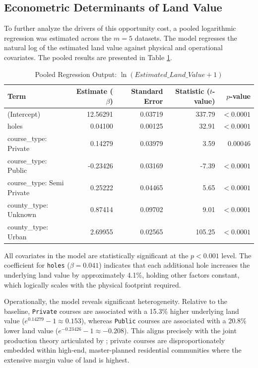 \documentclass[10pt, letterpaper]{article}
\begin{document}
\subsection{Econometric Determinants of Land Value}
To further analyze the drivers of this opportunity cost, a pooled logarithmic regression was estimated across the $m=5$ datasets. The model regresses the natural log of the estimated land value against physical and operational covariates. The pooled results are presented in Table \ref{tab:regression}.

\begin{table}[h!]
\centering
\caption{Pooled Regression Output: $\ln(Estimated\_Land\_Value + 1)$}
\label{tab:regression}
\renewcommand{\arraystretch}{1.2}
\begin{tabular}{l r r r r}
\hline
\textbf{Term} & \textbf{Estimate ($\beta$)} & \textbf{Standard Error} & \textbf{Statistic ($t$-value)} & \textbf{$p$-value} \\
\hline
(Intercept) & 12.56291 & 0.03719 & 337.79 & $< 0.0001$ \\
holes & 0.04100 & 0.00125 & 32.91 & $< 0.0001$ \\
course\_type: Private & 0.14279 & 0.03979 & 3.59 & $0.00046$ \\
course\_type: Public & -0.23426 & 0.03169 & -7.39 & $< 0.0001$ \\
course\_type: Semi Private & 0.25222 & 0.04465 & 5.65 & $< 0.0001$ \\
county\_type: Unknown & 0.87414 & 0.09702 & 9.01 & $< 0.0001$ \\
county\_type: Urban & 2.69955 & 0.02565 & 105.25 & $< 0.0001$ \\
\hline
\end{tabular}
\end{table}

All covariates in the model are statistically significant at the $p < 0.001$ level. The coefficient for \texttt{holes} ($\beta = 0.041$) indicates that each additional hole increases the underlying land value by approximately 4.1\%, holding other factors constant, which logically scales with the physical footprint required.

Operationally, the model reveals significant heterogeneity. Relative to the baseline, \texttt{Private} courses are associated with a 15.3\% higher underlying land value ($e^{0.14279} - 1 \approx 0.153$), whereas \texttt{Public} courses are associated with a 20.8\% lower land value ($e^{-0.23426} - 1 \approx -0.208$). This aligns precisely with the joint production theory articulated by \textcite{Limehouse2012}; private courses are disproportionately embedded within high-end, master-planned residential communities where the extensive margin value of land is highest.
\end{document}
